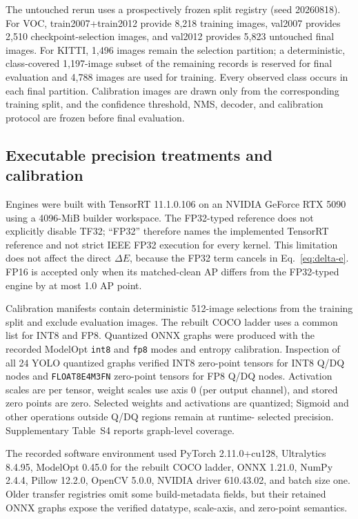 The untouched rerun uses a prospectively frozen split registry (seed 20260818).
For VOC, train2007+train2012 provide 8,218 training images, val2007 provides
2,510 checkpoint-selection images, and val2012 provides 5,823 untouched final
images. For KITTI, 1,496 images remain the selection partition; a deterministic,
class-covered 1,197-image subset of the remaining records is reserved for final
evaluation and 4,788 images are used for training. Every observed class occurs
in each final partition. Calibration images are drawn only from the
corresponding training split, and the confidence threshold, NMS, decoder, and
calibration protocol are frozen before final evaluation.

\subsection{Executable precision treatments and calibration}
\label{sec:precision-treatments}

Engines were built with TensorRT 11.1.0.106 on an NVIDIA GeForce RTX 5090 using
a 4096-MiB builder workspace. The FP32-typed reference does not explicitly
disable TF32; ``FP32'' therefore names the implemented TensorRT reference and
not strict IEEE FP32 execution for every kernel. This limitation does not affect
the direct $\Delta E$, because the FP32 term cancels in Eq.~\eqref{eq:delta-e}.
FP16 is accepted only when its matched-clean AP differs from the FP32-typed
engine by at most 1.0 AP point.

Calibration manifests contain deterministic 512-image selections from the
training split and exclude evaluation images. The rebuilt COCO ladder uses a
common list for INT8 and FP8. Quantized ONNX graphs were produced with the
recorded ModelOpt \texttt{int8} and \texttt{fp8} modes and entropy calibration.
Inspection of all 24 YOLO quantized graphs verified INT8 zero-point tensors for
INT8 Q/DQ nodes and \texttt{FLOAT8E4M3FN} zero-point tensors for FP8 Q/DQ
nodes. Activation scales are per tensor, weight scales use axis 0 (per output
channel), and stored zero points are zero. Selected weights and activations are
quantized; Sigmoid and other operations outside Q/DQ regions remain at runtime-
selected precision. Supplementary Table~S4 reports graph-level coverage.

The recorded software environment used PyTorch 2.11.0+cu128, Ultralytics
8.4.95, ModelOpt 0.45.0 for the rebuilt COCO ladder, ONNX 1.21.0, NumPy 2.4.4,
Pillow 12.2.0, OpenCV 5.0.0, NVIDIA driver 610.43.02, and batch size one.
Older transfer registries omit some build-metadata fields, but their retained
ONNX graphs expose the verified datatype, scale-axis, and zero-point semantics.

